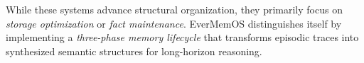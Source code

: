 While these systems advance structural organization, they primarily focus on \textit{storage optimization} or \textit{fact maintenance}. EverMemOS distinguishes itself by implementing a \textit{three-phase memory lifecycle} that transforms episodic traces into synthesized semantic structures for long-horizon reasoning.
